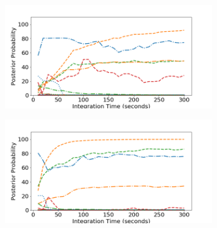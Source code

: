\begin{figure}[H]
     \centering
     \begin{subfigure}[b]{0.49\textwidth}
         \centering
         \includegraphics[width=\textwidth]{images/realspectra-cal-eu152-0-easy.png}
         \caption{}
         \label{fig:realspectra-cal-eu152-0-easy}
     \end{subfigure}
     \hfill
     \begin{subfigure}[b]{0.49\textwidth}
         \centering
         \includegraphics[width=\textwidth]{images/realspectra-cal-eu152-1-easy.png}
         \caption{}
         \label{fig:realspectra-cal-eu152-1-easy}
     \end{subfigure}


\end{figure}
